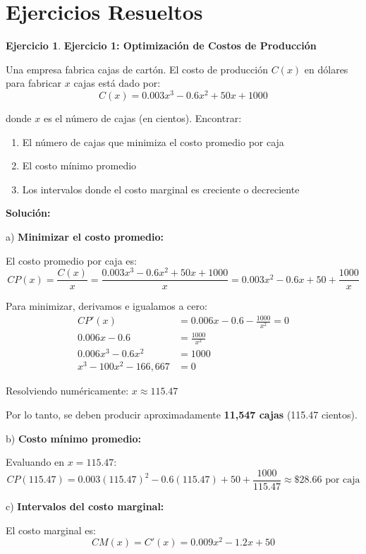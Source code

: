 \documentclass[12pt, a4paper, oneside]{book}
\theoremstyle{definition}
\newtheorem{ejercicio}{Ejercicio}[chapter]
\begin{document}
\section{Ejercicios Resueltos}

\begin{ejercicio}
\textbf{Ejercicio 1: Optimización de Costos de Producción}

Una empresa fabrica cajas de cartón. El costo de producción $C(x)$ en dólares para fabricar $x$ cajas está dado por:
$$C(x) = 0.003x^3 - 0.6x^2 + 50x + 1000$$

donde $x$ es el número de cajas (en cientos). Encontrar:
\begin{enumerate}[label=\alph*)]
    \item El número de cajas que minimiza el costo promedio por caja
    \item El costo mínimo promedio
    \item Los intervalos donde el costo marginal es creciente o decreciente
\end{enumerate}
\end{ejercicio}

\textbf{Solución:}

a) \textbf{Minimizar el costo promedio:}

El costo promedio por caja es:
$$CP(x) = \frac{C(x)}{x} = \frac{0.003x^3 - 0.6x^2 + 50x + 1000}{x} = 0.003x^2 - 0.6x + 50 + \frac{1000}{x}$$

Para minimizar, derivamos e igualamos a cero:
\begin{align*}
CP'(x) &= 0.006x - 0.6 - \frac{1000}{x^2} = 0 \\
0.006x - 0.6 &= \frac{1000}{x^2} \\
0.006x^3 - 0.6x^2 &= 1000 \\
x^3 - 100x^2 - 166,667 &= 0
\end{align*}

Resolviendo numéricamente: $x \approx 115.47$

Por lo tanto, se deben producir aproximadamente \textbf{11,547 cajas} (115.47 cientos).

b) \textbf{Costo mínimo promedio:}

Evaluando en $x = 115.47$:
$$CP(115.47) = 0.003(115.47)^2 - 0.6(115.47) + 50 + \frac{1000}{115.47} \approx \$28.66 \text{ por caja}$$

c) \textbf{Intervalos del costo marginal:}

El costo marginal es:
$$CM(x) = C'(x) = 0.009x^2 - 1.2x + 50$$
\end{document}
